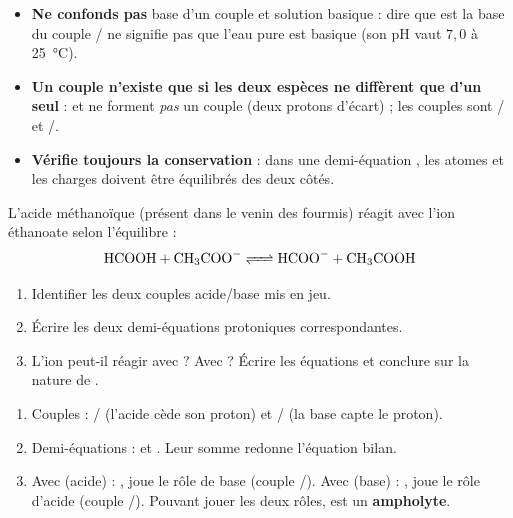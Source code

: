 \documentclass[11pt]{article}
\begin{document}
\begin{attention}
\begin{itemize}
\item \textbf{Ne confonds pas} \og base d'un couple \fg{} et \og solution basique \fg{} : dire que  est la base du couple / ne signifie pas que l'eau pure est basique (son pH vaut $7{,}0$ à \SI{25}{\celsius}).
\item \textbf{Un couple n'existe que si les deux espèces ne diffèrent que d'un seul } :  et  ne forment \emph{pas} un couple (deux protons d'écart) ; les couples sont / et /.
\item \textbf{Vérifie toujours la conservation} : dans une demi-équation , les atomes et les charges doivent être équilibrés des deux côtés.
\end{itemize}
\end{attention}

\begin{exercice}
L'acide méthanoïque  (présent dans le venin des fourmis) réagit avec l'ion éthanoate selon l'équilibre :
\[ \ce{HCOOH + CH3COO- <=> HCOO- + CH3COOH} \]
\begin{enumerate}
\item Identifier les deux couples acide/base mis en jeu.
\item Écrire les deux demi-équations protoniques correspondantes.
\item L'ion  peut-il réagir avec  ? Avec  ? Écrire les équations et conclure sur la nature de .
\end{enumerate}
\end{exercice}

\begin{corrige}[Exercice]
\begin{enumerate}
\item Couples : / (l'acide  cède son proton) et / (la base  capte le proton).
\item Demi-équations :  et . Leur somme redonne l'équation bilan.
\item Avec  (acide) : ,  joue le rôle de base (couple /). Avec  (base) : ,  joue le rôle d'acide (couple /). Pouvant jouer les deux rôles,  est un \textbf{ampholyte}.
\end{enumerate}
\end{corrige}
\end{document}
